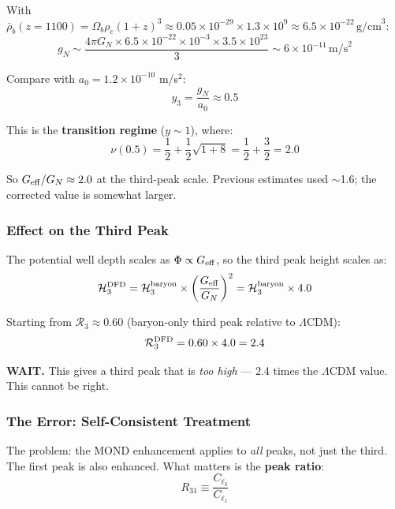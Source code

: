 \documentclass[11pt,a4paper]{article}
\begin{document}
With $\bar{\rho}_b(z=1100) = \Omega_b\rho_c(1+z)^3 \approx 0.05 \times 10^{-29} \times 1.3\times10^9 \approx 6.5 \times 10^{-22}\,\text{g/cm}^3$:
\begin{equation}
g_N \sim \frac{4\pi G_N \times 6.5\times10^{-22} \times 10^{-3} \times 3.5\times10^{23}}{3} \sim 6 \times 10^{-11}\,\text{m/s}^2
\end{equation}

Compare with $a_0 = 1.2 \times 10^{-10}$ m/s$^2$:
\begin{equation}
y_3 = \frac{g_N}{a_0} \approx 0.5
\end{equation}

This is the \textbf{transition regime} ($y \sim 1$), where:
\begin{equation}
\nu(0.5) = \frac{1}{2} + \frac{1}{2}\sqrt{1 + 8} = \frac{1}{2} + \frac{3}{2} = 2.0
\end{equation}

So $G_{\rm eff}/G_N \approx 2.0$ at the third-peak scale. Previous estimates used $\sim$1.6; the corrected value is somewhat larger.

\subsubsection{Effect on the Third Peak}

The potential well depth scales as $\Phi \propto G_{\rm eff}$, so the third peak height scales as:
\begin{equation}
\mathcal{H}_3^{\rm DFD} = \mathcal{H}_3^{\rm baryon} \times \left(\frac{G_{\rm eff}}{G_N}\right)^2 = \mathcal{H}_3^{\rm baryon} \times 4.0
\end{equation}

Starting from $\mathcal{R}_3 \approx 0.60$ (baryon-only third peak relative to $\Lambda$CDM):
\begin{equation}
\mathcal{R}_3^{\rm DFD} = 0.60 \times 4.0 = 2.4
\end{equation}

\textbf{WAIT.} This gives a third peak that is \emph{too high} --- 2.4 times the $\Lambda$CDM value. This cannot be right.

\subsubsection{The Error: Self-Consistent Treatment}

The problem: the MOND enhancement applies to \emph{all} peaks, not just the third. The first peak is also enhanced. What matters is the \textbf{peak ratio}:
\begin{equation}
R_{31} \equiv \frac{C_{\ell_3}}{C_{\ell_1}}
\end{equation}
\end{document}
